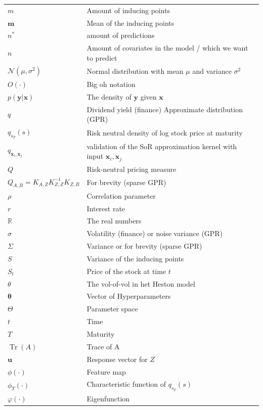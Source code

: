 \documentclass[12pt,a4paper,oneside]{book}
\DeclareMathOperator{\Tr}{Tr}
\begin{document}
\begin{tabular}{ll}
$m$ &   Amount of inducing points \\
$\bm{m}$ &   Mean of the inducing points  \\
$n^{\ast}$ & amount of predictions \\
$n$ &   Amount of covariates in the model / which we want to predict \\
$\mathcal{N}(\mu, \sigma^2)$ &  Normal distribution with mean $\mu$ and variance $\sigma^2$ \\
$O(\cdot)$ &  Big oh notation   \\
$p(\bm{y}|\bm{x})$ &  The density of $\bm{y}$ given $\bm{x}$    \\
$q$ &  Dividend yield (finance) Approximate distribution (GPR) \\
$q_{s_T}(s)$ & Risk neutral density of log stock price at maturity \\
$q_{\bm{x}_i,\bm{x}_j}$ &    validation of the SoR approximation kernel with input $\bm{x}_i , \bm{x}_j$ \\
$Q$ & Risk-neutral pricing measure \\ 
$Q_{A,B} = K_{A,Z} K_{Z,Z}^{-1} K_{Z,B}$ &  For brevity (sparse GPR)\\
$\rho$ & Correlation parameter \\ 
$r$ &  Interest rate \\
$\mathbb{R}$ &  The real numbers  \\
$\sigma$ &  Volatility (finance) or noise variance (GPR)  \\
$\Sigma$ & Variance or for brevity (sparse GPR) \\
$S$ & Variance of the inducing points \\
$S_t$ & Price of the stock at time $t$    \\
$\theta$ & The vol-of-vol in het Heston model \\ 
$\bm{\theta}$ & Vector of Hyperparameters   \\
$\Theta$ & Parameter space \\
$t$ & Time  \\
$T$ & Maturity \\
$\Tr{(A)}$ &  Trace of A  \\
$\bm{u}$ &  Response vector for $Z$  \\
$\phi(\cdot)$ &  Feature map  \\
$\phi_{T}(\cdot)$ & Characteristic function of $q_{s_T}(s)$ \\ 
$\varphi(\cdot)$ & Eigenfunction  \\

\end{tabular}
\end{document}
